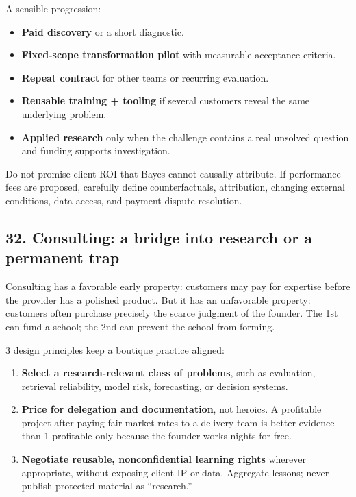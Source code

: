 A sensible progression:

\begin{itemize}[leftmargin=*,itemsep=1.5pt]
  \item \textbf{Paid discovery} or a short diagnostic.
  \item \textbf{Fixed-scope transformation pilot} with measurable acceptance criteria.
  \item \textbf{Repeat contract} for other teams or recurring evaluation.
  \item \textbf{Reusable training + tooling} if several customers reveal the same underlying problem.
  \item \textbf{Applied research} only when the challenge contains a real unsolved question and funding supports investigation.
\end{itemize}

Do not promise client ROI that Bayes cannot causally attribute. If performance fees are proposed, carefully define counterfactuals, attribution, changing external conditions, data access, and payment dispute resolution.

\subsection{32. Consulting: a bridge into research or a permanent trap}

Consulting has a favorable early property: customers may pay for expertise before the provider has a polished product. But it has an unfavorable property: customers often purchase precisely the scarce judgment of the founder. The 1st can fund a school; the 2nd can prevent the school from forming.

3 design principles keep a boutique practice aligned:

\begin{enumerate}[leftmargin=*,itemsep=1.5pt]
  \item \textbf{Select a research-relevant class of problems}, such as evaluation, retrieval reliability, model risk, forecasting, or decision systems.
  \item \textbf{Price for delegation and documentation}, not heroics. A profitable project after paying fair market rates to a delivery team is better evidence than 1 profitable only because the founder works nights for free.
  \item \textbf{Negotiate reusable, nonconfidential learning rights} wherever appropriate, without exposing client IP or data. Aggregate lessons; never publish protected material as ``research.''
\end{enumerate}


